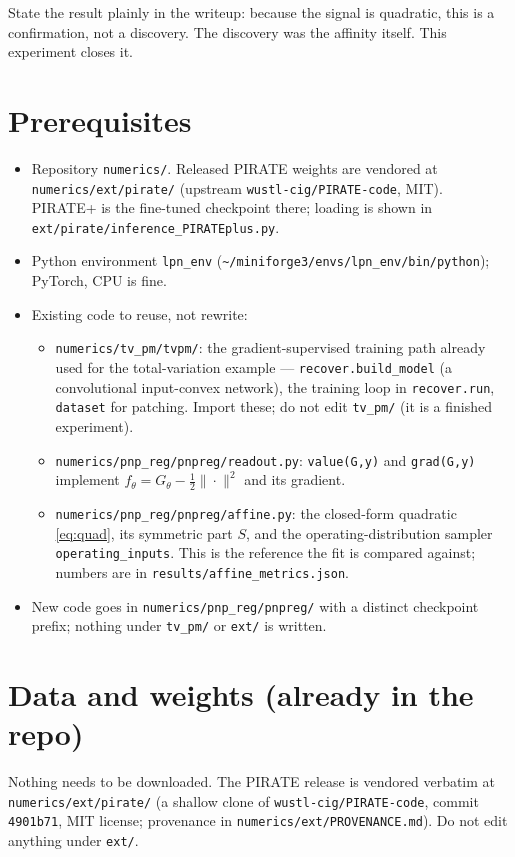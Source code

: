 \documentclass[11pt]{article}
\newcommand{\code}[1]{\texttt{#1}}
\begin{document}
State the result plainly in the writeup: because the signal is quadratic, this is a confirmation, not a discovery. The discovery was the affinity itself. This experiment closes it.

\section{Prerequisites}

\begin{itemize}
\item Repository \code{numerics/}. Released PIRATE weights are vendored at \code{numerics/ext/pirate/} (upstream \code{wustl-cig/PIRATE-code}, MIT). PIRATE+ is the fine-tuned checkpoint there; loading is shown in \code{ext/pirate/inference\_PIRATEplus.py}.
\item Python environment \code{lpn\_env} (\code{\textasciitilde/miniforge3/envs/lpn\_env/bin/python}); PyTorch, CPU is fine.
\item Existing code to reuse, not rewrite:
  \begin{itemize}
  \item \code{numerics/tv\_pm/tvpm/}: the gradient-supervised training path already used for the total-variation example --- \code{recover.build\_model} (a convolutional input-convex network), the training loop in \code{recover.run}, \code{dataset} for patching. Import these; do not edit \code{tv\_pm/} (it is a finished experiment).
  \item \code{numerics/pnp\_reg/pnpreg/readout.py}: \code{value(G,y)} and \code{grad(G,y)} implement $f_\theta = G_\theta - \tfrac12\|\cdot\|^2$ and its gradient.
  \item \code{numerics/pnp\_reg/pnpreg/affine.py}: the closed-form quadratic \eqref{eq:quad}, its symmetric part $S$, and the operating-distribution sampler \code{operating\_inputs}. This is the reference the fit is compared against; numbers are in \code{results/affine\_metrics.json}.
  \end{itemize}
\item New code goes in \code{numerics/pnp\_reg/pnpreg/} with a distinct checkpoint prefix; nothing under \code{tv\_pm/} or \code{ext/} is written.
\end{itemize}

\section{Data and weights (already in the repo)}

Nothing needs to be downloaded. The PIRATE release is vendored verbatim at \code{numerics/ext/pirate/} (a shallow clone of \code{wustl-cig/PIRATE-code}, commit \code{4901b71}, MIT license; provenance in \code{numerics/ext/PROVENANCE.md}). Do not edit anything under \code{ext/}.
\end{document}
